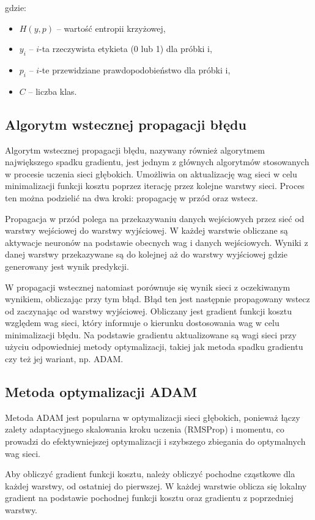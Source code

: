 \documentclass[a4paper]{article}
\begin{document}
gdzie:
\begin{itemize}
    \item  \(H(y, p)\) -- wartość entropii krzyżowej,
    \item  \(y_i\) -- \(i\)-ta rzeczywista etykieta (0 lub 1) dla próbki i,
    \item  \(p_i\) -- \(i\)-te przewidziane prawdopodobieństwo dla próbki i,
    \item \(C\) -- liczba klas.
\end{itemize}

\subsection{Algorytm wstecznej propagacji błędu}
Algorytm wstecznej propagacji błędu, nazywany również algorytmem największego spadku gradientu, jest jednym z głównych algorytmów stosowanych w procesie uczenia sieci głębokich.
Umożliwia on aktualizację wag sieci w celu minimalizacji funkcji kosztu poprzez iterację przez kolejne warstwy sieci.
Proces ten można podzielić na dwa kroki: propagację w przód oraz wstecz.

Propagacja w przód polega na przekazywaniu danych wejściowych przez sieć od warstwy wejściowej do warstwy wyjściowej.
W każdej warstwie obliczane są aktywacje neuronów na podstawie obecnych wag i danych wejściowych.
Wyniki z danej warstwy przekazywane są do kolejnej aż do warstwy wyjściowej gdzie generowany jest wynik predykcji.

W propagacji wstecznej natomiast porównuje się wynik sieci z oczekiwanym wynikiem, obliczając przy tym błąd.
Błąd ten jest następnie propagowany wstecz od zaczynając od warstwy wyjściowej.
Obliczany jest gradient funkcji kosztu względem wag sieci, który informuje o kierunku dostosowania wag w celu minimalizacji błędu.
Na podstawie gradientu aktualizowane są wagi sieci przy użyciu odpowiedniej metody optymalizacji, takiej jak metoda spadku gradientu czy też jej wariant, np. ADAM.

\subsection{Metoda optymalizacji ADAM}
Metoda ADAM jest popularna w optymalizacji sieci głębokich, ponieważ łączy zalety adaptacyjnego skalowania kroku uczenia (RMSProp) i momentu, co prowadzi do efektywniejszej optymalizacji i szybszego zbiegania do optymalnych wag sieci.

Aby obliczyć gradient funkcji kosztu, należy obliczyć pochodne cząstkowe dla każdej warstwy, od ostatniej do pierwszej.
W każdej warstwie oblicza się lokalny gradient na podstawie pochodnej funkcji kosztu oraz gradientu z poprzedniej warstwy.
\end{document}
